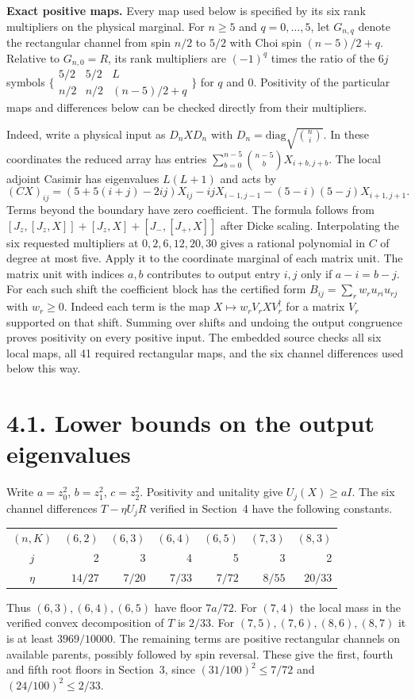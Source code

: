 \documentclass[11pt,a4paper]{article}
\begin{document}
\textbf{Exact positive maps.} Every map used below is specified by its six rank multipliers on the physical marginal. For $n\ge5$ and $q=0,\ldots,5$, let $G_{n,q}$ denote the rectangular channel from spin $n/2$ to $5/2$ with Choi spin $(n-5)/2+q$. Relative to $G_{n,0}=R$, its rank multipliers are $(-1)^q$ times the ratio of the $6j$ symbols $\bigl\{\begin{smallmatrix}5/2&5/2&L\\n/2&n/2&(n-5)/2+q\end{smallmatrix}\bigr\}$ for $q$ and $0$. Positivity of the particular maps and differences below can be checked directly from their multipliers.

Indeed, write a physical input as $D_n X D_n$ with $D_n=\mathrm{diag}\sqrt{\binom ni}$. In these coordinates the reduced array has entries $\sum_{b=0}^{n-5}\binom{n-5}b X_{i+b,j+b}$. The local adjoint Casimir has eigenvalues $L(L+1)$ and acts by
\[
 (CX)_{ij}=(5+5(i+j)-2ij)X_{ij}-ijX_{i-1,j-1}-(5-i)(5-j)X_{i+1,j+1}.
\]
Terms beyond the boundary have zero coefficient. The formula follows from $[J_z,[J_z,X]]+[J_z,X]+[J_-,[J_+,X]]$ after Dicke scaling. Interpolating the six requested multipliers at $0,2,6,12,20,30$ gives a rational polynomial in $C$ of degree at most five. Apply it to the coordinate marginal of each matrix unit. The matrix unit with indices $a,b$ contributes to output entry $i,j$ only if $a-i=b-j$. For each such shift the coefficient block has the certified form $B_{ij}=\sum_r w_r u_{ri}u_{rj}$ with $w_r\ge0$. Indeed each term is the map $X\mapsto w_r V_r X V_r^\dagger$ for a matrix $V_r$ supported on that shift. Summing over shifts and undoing the output congruence proves positivity on every positive input. The embedded source checks all six local maps, all 41 required rectangular maps, and the six channel differences used below this way.

\newpage
\section*{4.1. Lower bounds on the output eigenvalues}
Write $a=z_0^2$, $b=z_1^2$, $c=z_2^2$. Positivity and unitality give $U_j(X)\ge aI$. The six channel differences $T-\eta U_j R$ verified in Section~4 have the following constants.
\begin{center}\small
\begin{tabular}{c|rrrrrr}\toprule
$(n,K)$ & $(6,2)$ & $(6,3)$ & $(6,4)$ & $(6,5)$ & $(7,3)$ & $(8,3)$\\
$j$ &2&3&4&5&3&2\\
$\eta$ & $14/27$ & $7/20$ & $7/33$ & $7/72$ & $8/55$ & $20/33$\\\bottomrule
\end{tabular}\end{center}
Thus $(6,3),(6,4),(6,5)$ have floor $7a/72$. For $(7,4)$ the local mass in the verified convex decomposition of $T$ is $2/33$. For $(7,5),(7,6),(8,6),(8,7)$ it is at least $3969/10000$. The remaining terms are positive rectangular channels on available parents, possibly followed by spin reversal. These give the first, fourth and fifth root floors in Section~3, since $(31/100)^2\le7/72$ and $(24/100)^2\le2/33$.
\end{document}
